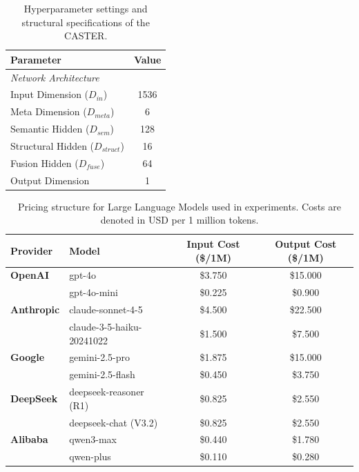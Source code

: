 \documentclass{article}
\theoremstyle{plain}
\theoremstyle{definition}
\theoremstyle{remark}
\begin{document}
\begin{table}[h]
\centering
\caption{Hyperparameter settings and structural specifications of the CASTER.}
\label{tab:hyperparams}
\begin{tabular}{lc}
\toprule
\textbf{Parameter} & \textbf{Value} \\
\midrule
\multicolumn{2}{l}{\textit{Network Architecture}} \\
Input Dimension ($D_{in}$) & 1536 \\
Meta Dimension ($D_{meta}$) & 6 \\
Semantic Hidden ($D_{sem}$) & 128 \\
Structural Hidden ($D_{struct}$) & 16 \\
Fusion Hidden ($D_{fuse}$) & 64 \\
Output Dimension & 1 \\
\midrule

\end{tabular}
\end{table}
\begin{table}[h]
    \centering
    \caption{Pricing structure for Large Language Models used in experiments. Costs are denoted in USD per 1 million tokens.}
    \label{tab:llm_pricing}
    \begin{tabular}{llcc}
        \toprule
        \textbf{Provider} & \textbf{Model} & \textbf{Input Cost (\$/1M)} & \textbf{Output Cost (\$/1M)} \\
        \midrule
        \textbf{OpenAI} & gpt-4o& \$3.750& \$15.000\\
         & gpt-4o-mini& \$0.225& \$0.900\\
        \midrule
        \textbf{Anthropic} & claude-sonnet-4-5& \$4.500& \$22.500\\
         & claude-3-5-haiku-20241022& \$1.500& \$7.500\\
        \midrule
        \textbf{Google} & gemini-2.5-pro& \$1.875& \$15.000\\
         & gemini-2.5-flash& \$0.450& \$3.750\\
        \midrule
        \textbf{DeepSeek} & deepseek-reasoner (R1)& \$0.825& \$2.550\\
         & deepseek-chat (V3.2)& \$0.825& \$2.550\\
        \midrule
        \textbf{Alibaba} & qwen3-max& \$0.440& \$1.780\\
         & qwen-plus& \$0.110& \$0.280\\
        \bottomrule
    \end{tabular}
\end{table}
\end{document}
